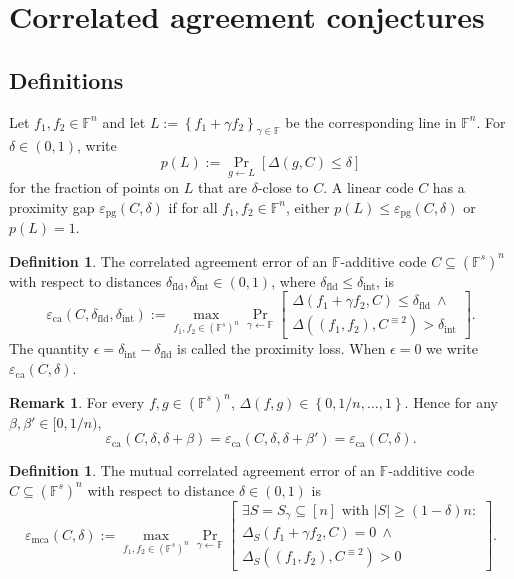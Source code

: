 \documentclass[11pt]{article}
\theoremstyle{plain}
\theoremstyle{definition}
\newtheorem{definition}[theorem]{Definition}
\newtheorem{remark}[theorem]{Remark}
\newcommand{\F}{\mathbb{F}}
\newcommand{\epspg}{\varepsilon_{\mathrm{pg}}}
\newcommand{\epsca}{\varepsilon_{\mathrm{ca}}}
\newcommand{\epsmca}{\varepsilon_{\mathrm{mca}}}
\newcommand{\fld}{\mathrm{fld}}
\newcommand{\intr}{\mathrm{int}}
\newcommand{\set}[1]{\left\{#1\right\}}
\newcommand{\abs}[1]{\left|#1\right|}
\DeclareMathOperator*{\Prb}{Pr}
\begin{document}
\section{Correlated agreement conjectures}

\subsection{Definitions}

Let $f_1,f_2\in\F^n$ and let $L:=\set{f_1+\gamma f_2}_{\gamma\in\F}$ be the corresponding line in $\F^n$. For $\delta\in(0,1)$, write
\[
  p(L):=\Prb_{g\leftarrow L}[\Delta(g,C)\le\delta]
\]
for the fraction of points on $L$ that are $\delta$-close to $C$. A linear code $C$ has a proximity gap $\epspg(C,\delta)$ if for all $f_1,f_2\in\F^n$, either $p(L)\le\epspg(C,\delta)$ or $p(L)=1$.

\begin{definition}
The correlated agreement error of an $\F$-additive code $C\subseteq(\F^s)^n$ with respect to distances $\delta_{\fld},\delta_{\intr}\in(0,1)$, where $\delta_{\fld}\le\delta_{\intr}$, is
\[
\epsca(C,\delta_{\fld},\delta_{\intr})
:=\max_{f_1,f_2\in(\F^s)^n}
\Prb_{\gamma\leftarrow\F}\left[
\begin{array}{c}
\Delta(f_1+\gamma f_2,C)\le\delta_{\fld}\ \wedge\\
\Delta((f_1,f_2),C^{\equiv2})>\delta_{\intr}
\end{array}
\right].
\]
The quantity $\epsilon=\delta_{\intr}-\delta_{\fld}$ is called the proximity loss. When $\epsilon=0$ we write $\epsca(C,\delta)$.
\end{definition}

\begin{remark}
For every $f,g\in(\F^s)^n$, $\Delta(f,g)\in\set{0,1/n,\ldots,1}$. Hence for any $\beta,\beta'\in[0,1/n)$,
\[
  \epsca(C,\delta,\delta+\beta)=\epsca(C,\delta,\delta+\beta')=\epsca(C,\delta).
\]
\end{remark}

\begin{definition}
The mutual correlated agreement error of an $\F$-additive code $C\subseteq(\F^s)^n$ with respect to distance $\delta\in(0,1)$ is
\[
\epsmca(C,\delta):=\max_{f_1,f_2\in(\F^s)^n}
\Prb_{\gamma\leftarrow\F}\left[
\begin{array}{c}
\exists S=S_\gamma\subseteq[n]\text{ with }\abs{S}\ge(1-\delta)n:\\
\Delta_S(f_1+\gamma f_2,C)=0\ \wedge\\
\Delta_S((f_1,f_2),C^{\equiv2})>0
\end{array}
\right].
\]
\end{definition}
\end{document}
